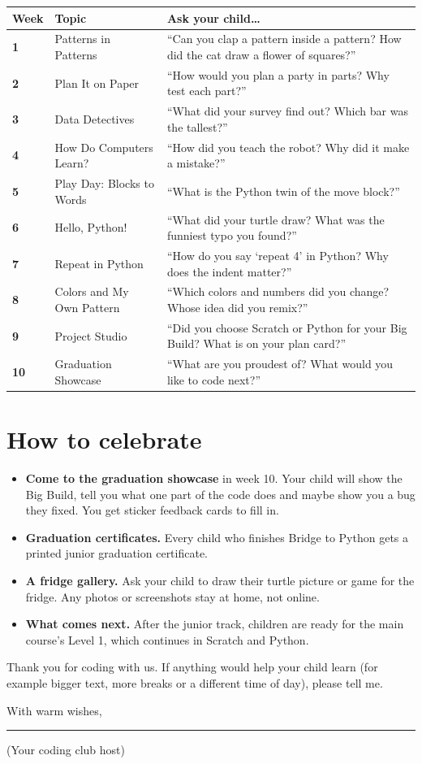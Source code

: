 \documentclass[track=junior,level=3]{kidscode}
\begin{document}
\begin{center}\small\renewcommand{\arraystretch}{1.45}
\begin{tabularx}{\linewidth}{@{}>{\bfseries}p{1.0cm}>{\RaggedRight}p{4.2cm}>{\RaggedRight\arraybackslash}X@{}}
\toprule
Week & Topic & Ask your child\dots\\
\midrule
1 & Patterns in Patterns & \enquote{Can you clap a pattern inside a pattern? How did the cat draw a flower of squares?}\\
2 & Plan It on Paper & \enquote{How would you plan a party in parts? Why test each part?}\\
3 & Data Detectives & \enquote{What did your survey find out? Which bar was the tallest?}\\
4 & How Do Computers Learn? & \enquote{How did you teach the robot? Why did it make a mistake?}\\
5 & Play Day: Blocks to Words & \enquote{What is the Python twin of the move block?}\\
6 & Hello, Python! & \enquote{What did your turtle draw? What was the funniest typo you found?}\\
7 & Repeat in Python & \enquote{How do you say \enquote{repeat 4} in Python? Why does the indent matter?}\\
8 & Colors and My Own Pattern & \enquote{Which colors and numbers did you change? Whose idea did you remix?}\\
9 & Project Studio & \enquote{Did you choose Scratch or Python for your Big Build? What is on your plan card?}\\
10 & Graduation Showcase & \enquote{What are you proudest of? What would you like to code next?}\\
\bottomrule
\end{tabularx}
\end{center}

\section{How to celebrate}
\begin{itemize}[itemsep=3pt]
  \item \textbf{Come to the graduation showcase} in week 10. Your child will show the Big Build, tell
        you what one part of the code does and maybe show you a bug they fixed. You get sticker feedback
        cards to fill in.
  \item \textbf{Graduation certificates.} Every child who finishes Bridge to Python gets a printed junior
        graduation certificate.
  \item \textbf{A fridge gallery.} Ask your child to draw their turtle picture or game for the fridge.
        Any photos or screenshots stay at home, not online.
  \item \textbf{What comes next.} After the junior track, children are ready for the main course's
        Level 1, which continues in Scratch and Python.
\end{itemize}

\bigskip
Thank you for coding with us. If anything would help your child learn (for example bigger text,
more breaks or a different time of day), please tell me.

\bigskip
With warm wishes,\par\bigskip
\rule{6cm}{0.4pt}\par
{\small (Your coding club host)}
\end{document}
